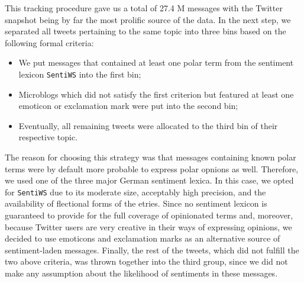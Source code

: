 




This tracking procedure gave us a total of 27.4 M messages with the
Twitter snapshot being by far the most prolific source of the data.
In the next step, we separated all tweets pertaining to the same topic
into three bins based on the following formal criteria:
\begin{itemize}
\item We put messages that contained at least one polar term from the
  sentiment lexicon \texttt{SentiWS} \cite{Remus:10} into the first
  bin;
\item Microblogs which did not satisfy the first criterion but
  featured at least one emoticon or exclamation mark were put into the
  second bin;
\item Eventually, all remaining tweets were allocated to the third bin
  of their respective topic.
\end{itemize}
The reason for choosing this strategy was that messages containing
known polar terms were by default more probable to express polar
opnions as well.  Therefore, we used one of the three major German
sentiment lexica.  In this case, we opted for \texttt{SentiWS}
\cite{Remus:10} due to its moderate size, acceptably high precision,
and the availability of flectional forms of the etries.  Since no
sentiment lexicon is guaranteed to provide for the full coverage of
opinionated terms and, moreover, because Twitter users are very
creative in their ways of expressing opinions, we decided to use
emoticons and exclamation marks as an alternative source of
sentiment-laden messages.  Finally, the rest of the tweets, which did
not fulfill the two above criteria, was thrown together into the third
group, since we did not make any assumption about the likelihood of
sentiments in these messages.

